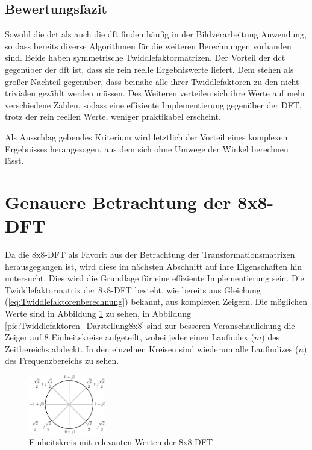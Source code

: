  
 \subsection{Bewertungsfazit}
 Sowohl die \gls{dct} als auch die \gls{dft} finden häufig in der Bildverarbeitung Anwendung, so dass bereits diverse Algorithmen für die weiteren
 Berechnungen vorhanden sind. Beide haben symmetrische Twiddlefaktormatrizen.
 Der Vorteil der \gls{dct} gegenüber der \gls{dft} ist, dass sie rein reelle Ergebniswerte liefert. 
 Dem stehen als großer Nachteil gegenüber, dass beinahe alle ihrer Twiddlefaktoren zu den nicht trivialen gezählt werden müssen. 
 Des Weiteren verteilen sich ihre Werte auf mehr verschiedene Zahlen, sodass eine effiziente Implementierung gegenüber der DFT, trotz der rein reellen
 Werte, weniger praktikabel erscheint.
 
 Als Ausschlag gebendes Kriterium wird letztlich der Vorteil eines komplexen Ergebnisses herangezogen, aus dem sich ohne Umwege der Winkel berechnen lässt.

 

 
 
 \section{Genauere Betrachtung der 8x8-DFT}
 Da die 8x8-DFT als Favorit aus der Betrachtung der Transformationsmatrizen herausgegangen ist, wird diese im nächsten Abschnitt auf ihre Eigenschaften
 hin untersucht. Dies wird die Grundlage für eine effiziente Implementierung sein. 
 Die Twiddlefaktormatrix der 8x8-DFT besteht, wie bereits aus Gleichung (\ref{eq:Twiddlefaktorenberechnung}) bekannt, aus komplexen Zeigern.
 Die möglichen Werte sind in Abbildung \ref{pic:Einheitskreis_Faktoren} zu sehen, 
 in Abbildung \ref{pic:Twiddlefaktoren_Darstellung8x8} sind zur besseren Veranschaulichung die Zeiger auf 8 Einheitskreise aufgeteilt,
 wobei jeder einen Laufindex ($m$) des Zeitbereichs abdeckt. In den einzelnen Kreisen sind wiederum alle Laufindizes ($n$) des Frequenzbereichs zu sehen.
 
  \begin{figure}[!h]
  \centering
  \includegraphics[width=0.3\textwidth]{img/Einheitskreis-crop.pdf}
  \caption{Einheitskreis mit relevanten Werten der 8x8-DFT}
  \label{pic:Einheitskreis_Faktoren}
\end{figure}
  
